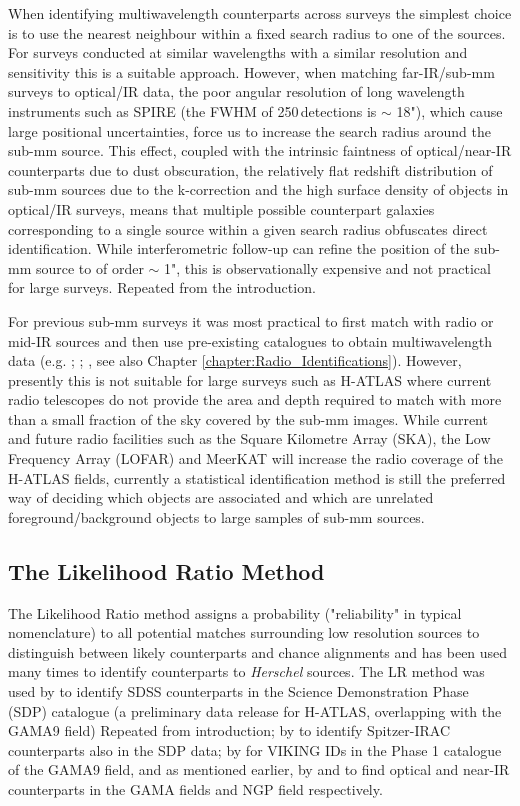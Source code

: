 When identifying multiwavelength counterparts across surveys the simplest choice is to use the nearest neighbour within a fixed search radius to one of the sources. For surveys conducted at similar wavelengths with a similar resolution and sensitivity this is a suitable approach. However, when matching far-IR/sub-mm surveys to optical/IR data, the poor angular resolution of long wavelength instruments such as SPIRE (the FWHM of 250\,\micron detections is $\sim$ 18"), which cause large positional uncertainties, force us to increase the search radius around the sub-mm source. This effect, coupled with the intrinsic faintness of optical/near-IR counterparts due to dust obscuration, the relatively flat redshift distribution of sub-mm sources due to the k-correction and the high surface density of objects in optical/IR surveys, means that multiple possible counterpart galaxies corresponding to a single source within a given search radius obfuscates direct identification. While interferometric follow-up can refine the position of the sub-mm source to of order $\sim$ 1", this is observationally expensive and not practical for large surveys. {\color{red}Repeated from the introduction.}

For previous sub-mm surveys it was most practical to first match with radio or mid-IR sources and then use pre-existing catalogues to obtain multiwavelength data (e.g. \citealt{Ivison_2007}; \citealt{Dye_2009}; \citealt{Biggs_2011}, see also Chapter \ref{chapter:Radio_Identifications}). However, presently this is not suitable for large surveys such as H-ATLAS where current radio telescopes do not provide the area and depth required to match with more than a small fraction of the sky covered by the sub-mm images. While current and future radio facilities such as the Square Kilometre Array (SKA), the Low Frequency Array (LOFAR) and MeerKAT will increase the radio coverage of the H-ATLAS fields, currently a statistical identification method is still the preferred way of deciding which objects are associated and which are unrelated foreground/background objects to large samples of sub-mm sources.

\subsection{The Likelihood Ratio Method}
\label{sec:The Likelihood Ratio Method}

The Likelihood Ratio method assigns a probability ("reliability" in typical nomenclature) to all potential matches surrounding low resolution sources to distinguish between likely counterparts and chance alignments and has been used many times to identify counterparts to \textit{Herschel} sources. The LR method was used by \citealt{Smith_2011} to identify SDSS counterparts in the Science Demonstration Phase (SDP) catalogue (a preliminary data release for H-ATLAS, overlapping with the GAMA9 field) {\color{red}Repeated from introduction}; by \citealt{Kim_2012} to identify Spitzer-IRAC counterparts also in the SDP data; by \citealt{Fleuren_2012} for VIKING IDs in the Phase 1 catalogue of the GAMA9 field, and as mentioned earlier, by \citealt{Bourne_2016} and \citealt{Furlanetto_2018} to find optical and near-IR counterparts in the GAMA fields and NGP field respectively.

